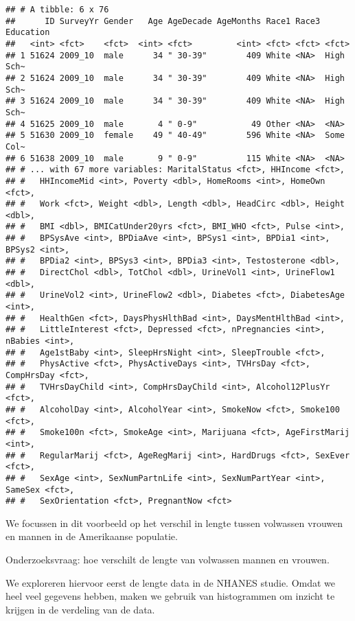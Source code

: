\documentclass[
  12pt,dutch,coursenotes]{book}
\theoremstyle{definition}
\theoremstyle{definition}
\theoremstyle{definition}
\theoremstyle{remark}
\begin{document}
\begin{verbatim}
## # A tibble: 6 x 76
##      ID SurveyYr Gender   Age AgeDecade AgeMonths Race1 Race3 Education
##   <int> <fct>    <fct>  <int> <fct>         <int> <fct> <fct> <fct>    
## 1 51624 2009_10  male      34 " 30-39"        409 White <NA>  High Sch~
## 2 51624 2009_10  male      34 " 30-39"        409 White <NA>  High Sch~
## 3 51624 2009_10  male      34 " 30-39"        409 White <NA>  High Sch~
## 4 51625 2009_10  male       4 " 0-9"           49 Other <NA>  <NA>     
## 5 51630 2009_10  female    49 " 40-49"        596 White <NA>  Some Col~
## 6 51638 2009_10  male       9 " 0-9"          115 White <NA>  <NA>     
## # ... with 67 more variables: MaritalStatus <fct>, HHIncome <fct>,
## #   HHIncomeMid <int>, Poverty <dbl>, HomeRooms <int>, HomeOwn <fct>,
## #   Work <fct>, Weight <dbl>, Length <dbl>, HeadCirc <dbl>, Height <dbl>,
## #   BMI <dbl>, BMICatUnder20yrs <fct>, BMI_WHO <fct>, Pulse <int>,
## #   BPSysAve <int>, BPDiaAve <int>, BPSys1 <int>, BPDia1 <int>, BPSys2 <int>,
## #   BPDia2 <int>, BPSys3 <int>, BPDia3 <int>, Testosterone <dbl>,
## #   DirectChol <dbl>, TotChol <dbl>, UrineVol1 <int>, UrineFlow1 <dbl>,
## #   UrineVol2 <int>, UrineFlow2 <dbl>, Diabetes <fct>, DiabetesAge <int>,
## #   HealthGen <fct>, DaysPhysHlthBad <int>, DaysMentHlthBad <int>,
## #   LittleInterest <fct>, Depressed <fct>, nPregnancies <int>, nBabies <int>,
## #   Age1stBaby <int>, SleepHrsNight <int>, SleepTrouble <fct>,
## #   PhysActive <fct>, PhysActiveDays <int>, TVHrsDay <fct>, CompHrsDay <fct>,
## #   TVHrsDayChild <int>, CompHrsDayChild <int>, Alcohol12PlusYr <fct>,
## #   AlcoholDay <int>, AlcoholYear <int>, SmokeNow <fct>, Smoke100 <fct>,
## #   Smoke100n <fct>, SmokeAge <int>, Marijuana <fct>, AgeFirstMarij <int>,
## #   RegularMarij <fct>, AgeRegMarij <int>, HardDrugs <fct>, SexEver <fct>,
## #   SexAge <int>, SexNumPartnLife <int>, SexNumPartYear <int>, SameSex <fct>,
## #   SexOrientation <fct>, PregnantNow <fct>
\end{verbatim}

We focussen in dit voorbeeld op het verschil in lengte tussen volwassen vrouwen en mannen in de Amerikaanse populatie.

Onderzoeksvraag: hoe verschilt de lengte van volwassen mannen en vrouwen.

We exploreren hiervoor eerst de lengte data in de NHANES studie. Omdat we heel veel gegevens hebben, maken we gebruik van histogrammen om inzicht te krijgen in de verdeling van de data.
\end{document}
